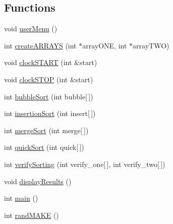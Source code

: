 \subsection*{Functions}
\begin{DoxyCompactItemize}
\item 
void \hyperlink{_delouth_mansfield-_assn4-_functions_8cpp_adcd155b8f245b1bf80a9863a6301f4ff}{userMenu} ()
\item 
int \hyperlink{_delouth_mansfield-_assn4-_functions_8cpp_af6def39a6d22c624eb8874f368ea429e}{createARRAYS} (int $\ast$arrayONE, int $\ast$arrayTWO)
\item 
void \hyperlink{_delouth_mansfield-_assn4-_functions_8cpp_a6b17282d3fa11bfcbc1d8098878dbb24}{clockSTART} (int \&start)
\item 
void \hyperlink{_delouth_mansfield-_assn4-_functions_8cpp_afeefecdec1b2e0e10953da91eba90ef3}{clockSTOP} (int \&start)
\item 
int \hyperlink{_delouth_mansfield-_assn4-_functions_8cpp_a8bb793ac49cd588089713622d18a8c5b}{bubbleSort} (int bubble\mbox{[}$\,$\mbox{]})
\item 
int \hyperlink{_delouth_mansfield-_assn4-_functions_8cpp_abdd451b9bf57eb321b817db4405d65fd}{insertionSort} (int insert\mbox{[}$\,$\mbox{]})
\item 
int \hyperlink{_delouth_mansfield-_assn4-_functions_8cpp_a4c0a2c1198c153a63a9632ce3dc44921}{mergeSort} (int merge\mbox{[}$\,$\mbox{]})
\item 
int \hyperlink{_delouth_mansfield-_assn4-_functions_8cpp_a9e940b0f849a62e9ff4319606269ae38}{quickSort} (int quick\mbox{[}$\,$\mbox{]})
\item 
int \hyperlink{_delouth_mansfield-_assn4-_functions_8cpp_ac769e49e955e35b43bc75d4201200e25}{verifySorting} (int verify\_\-one\mbox{[}$\,$\mbox{]}, int verify\_\-two\mbox{[}$\,$\mbox{]})
\item 
void \hyperlink{_delouth_mansfield-_assn4-_functions_8cpp_ad6cced161336750300edfabbe2f387a9}{displayResults} ()
\item 
int \hyperlink{_delouth_mansfield-_assn4-_functions_8cpp_ae66f6b31b5ad750f1fe042a706a4e3d4}{main} ()
\item 
int \hyperlink{_delouth_mansfield-_assn4-_functions_8cpp_a191743d28b671610e8d78df14b41ed9e}{randMAKE} ()
\end{DoxyCompactItemize}
